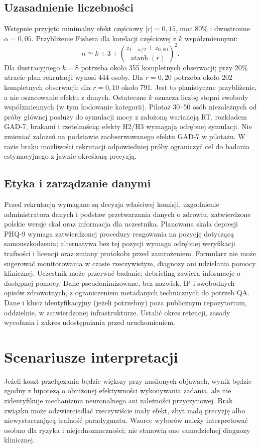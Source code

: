 \documentclass[11pt,a4paper]{article}
\begin{document}
\subsection{Uzasadnienie liczebności}
Wstępnie przyjęto minimalny efekt częściowy $|r|=0{,}15$, moc 80\% i dwustronne $\alpha=0{,}05$. Przybliżenie Fishera dla korelacji częściowej z $k$ współzmiennymi:
\begin{equation}
n\simeq k+3+\left(\frac{z_{1-\alpha/2}+z_{0{,}80}}{\operatorname{atanh}(r)}\right)^2.
\end{equation}
Dla ilustracyjnego $k=8$ potrzeba około 355 kompletnych obserwacji; przy 20\% utracie plan rekrutacji wynosi 444 osoby. Dla $r=0{,}20$ potrzeba około 202 kompletnych obserwacji; dla $r=0{,}10$ około 791. Jest to planistyczne przybliżenie, a nie oszacowanie efektu z danych. Ostateczne $k$ oznacza liczbę stopni swobody współzmiennych (w tym kodowanie kategorii). Pilotaż 30--50 osób niezależnych od próby głównej posłuży do symulacji mocy z założoną wariancją RT, rozkładem GAD-7, brakami i rzetelnością; efekty H2/H3 wymagają odrębnej symulacji. Nie zmieniać założeń na podstawie zaobserwowanego efektu GAD-7 w pilotażu. W razie braku możliwości rekrutacji odpowiedniej próby ograniczyć cel do badania estymacyjnego z jawnie określoną precyzją.

\subsection{Etyka i zarządzanie danymi}
Przed rekrutacją wymagane są decyzja właściwej komisji, uzgodnienie administratora danych i podstaw przetwarzania danych o zdrowiu, zatwierdzone polskie wersje skal oraz informacja dla uczestnika. Planowana skala depresji PHQ-9 wymaga zatwierdzonej procedury reagowania na pozycję dotyczącą samouszkodzenia; alternatywa bez tej pozycji wymaga odrębnej weryfikacji trafności i licencji oraz zmiany protokołu przed zamrożeniem. Formularz nie może sugerować monitorowania w czasie rzeczywistym, diagnozy ani udzielania pomocy klinicznej. Uczestnik może przerwać badanie; debriefing zawiera informacje o dostępnej pomocy. Dane pseudonimizowane, bez nazwisk, IP i swobodnych opisów zdrowotnych, z ograniczeniem metadanych technicznych do potrzeb QA. Dane i klucz identyfikacyjny (jeżeli potrzebny) poza publicznym repozytorium, oddzielnie, w zatwierdzonej infrastrukturze. Ustalić okres retencji, zasady wycofania i zakres udostępniania przed uruchomieniem.

\section{Scenariusze interpretacji}
Jeżeli koszt przełączania będzie większy przy nasilonych objawach, wynik będzie zgodny z hipotezą o obniżonej efektywności wykonywania zadania, ale nie zidentyfikuje mechanizmu neuronalnego ani zależności przyczynowej. Brak związku może odzwierciedlać rzeczywiście mały efekt, zbyt małą precyzję albo niewystarczającą trafność paradygmatu. Wzorce wyborów należy interpretować osobno dla ryzyka i niejednoznaczności; nie stanowią one samodzielnej diagnozy klinicznej.
\end{document}

